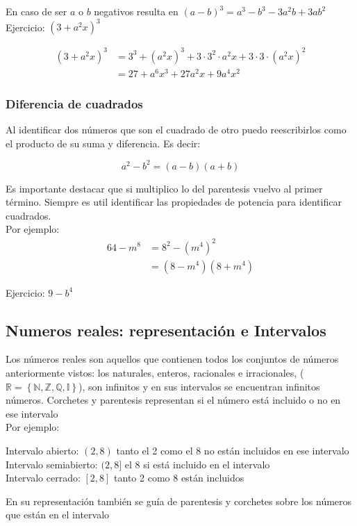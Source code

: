 \documentclass[a4paper]{article}
\begin{document}
En caso de ser $a$ o $b$ negativos resulta en $(a-b)^3=a^3-b^3-3a^2b+3ab^2$\\

Ejercicio: $(3+a^2x)^3$ 

\begin{align*}
    (3+a^2x)^3&= 3^3+(a^2x)^3+3\cdot 3^2\cdot a^2x+3\cdot 3\cdot(a^2x)^2\\
    &=27+a^6x^3+27a^2x+9a^4x^2
\end{align*}


\subsubsection{Diferencia de cuadrados}
Al identificar dos números que son el cuadrado de otro puedo reescribirlos como el producto de su suma y diferencia. Es decir:

\[
    a^2-b^2=(a-b)(a+b)
\]

Es importante destacar que si multiplico lo del parentesis vuelvo al primer término. Siempre es util identificar las propiedades de potencia para identificar cuadrados.\\
Por ejemplo: 
\begin{align}
    64-m^8&=8^2-(m^4)^2 \\
    &=(8-m^4)(8+m^4)
\end{align}

Ejercicio: $9-b^4$

\subsection{Numeros reales: representación e Intervalos}
Los números reales son aquellos que contienen todos los conjuntos de números anteriormente vistos: los naturales, enteros, racionales e irracionales, ($\mathbb{R}=\left\{\mathbb{N}, \mathbb{Z}, \mathbb{Q}, \mathbb{I}\right\}$), son infinitos y en sus intervalos se encuentran infinitos números.
Corchetes y parentesis representan si el número está incluido o no en ese intervalo\\
Por ejemplo:
\begin{flushleft}
Intervalo abierto: $(2,8)$ tanto el 2 como el 8 no están incluidos en ese intervalo\\
Intervalo semiabierto: $(2,8]$ el 8 si está incluido en el intervalo\\
Intervalo cerrado: $[2,8]$ tanto 2 como 8 están incluidos
\end{flushleft}

En su representación también se guía de parentesis y corchetes sobre los números que están en el intervalo\\
\end{document}
